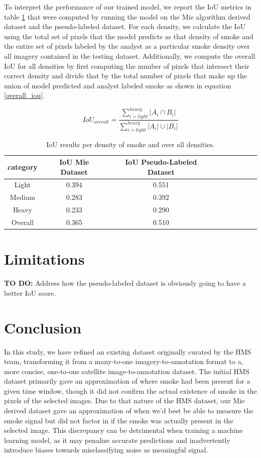 \documentclass{article}
\begin{document}
To interpret the performance of our trained model, we report the IoU metrics in table \ref{iou_results} that were computed by running the model on the Mie algorithm derived dataset and the pseudo-labeled dataset. For each density, we calculate the IoU using the total set of pixels that the model predicts as that density of smoke and the entire set of pixels labeled by the analyst as a particular smoke density over all imagery contained in the testing dataset. Additionally, we compute the overall IoU for all densities by first computing the number of pixels that intersect their correct density and divide that by the total number of pixels that make up the union of model predicted and analyst labeled smoke as shown in equation \ref{overall_iou}.


\begin{equation} \label{overall_iou}
    IoU_{overall} = \frac{\sum\limits_{i=light}^{heavy}|A_{i}\cap B_{i}|  }{\sum\limits_{i=light}^{heavy}|A_{i}|\cup|B_{i}|}
\end{equation}

\begin{table} 
    \caption{IoU results per density of smoke and over all densities.}\label{iou_results}
    \centering
    \begin{tabular}{ccccrrcrc}
        \toprule
        category & IoU Mie Dataset & IoU Pseudo-Labeled Dataset \\ 
        \midrule
        Light  & 0.394 &  0.551 \\
        Medium & 0.283 &  0.392 \\
        Heavy  & 0.233 &  0.290 \\
        Overall & 0.365 &  0.510 \\
        \bottomrule
    \end{tabular}
\end{table}

\section{Limitations}
\textbf{TO DO:} Address how the pseudo-labeled dataset is obviously going to have a better IoU score.
\section{Conclusion}

In this study, we have refined an existing dataset originally curated by the HMS team, transforming it from a many-to-one imagery-to-annotation format to a, more concise, one-to-one satellite image-to-annotation dataset. The initial HMS dataset primarily gave an approximation of where smoke had been present for a given time window, though it did not confirm the actual existence of smoke in the pixels of the selected images. Due to that nature of the HMS dataset, our Mie derived dataset gave an approximation of when we'd best be able to measure the smoke signal but did not factor in if the smoke was actually present in the selected image. This discrepancy can be detrimental when training a machine learning model, as it may penalize accurate predictions and inadvertently introduce biases towards misclassifying noise as meaningful signal. 
\end{document}
